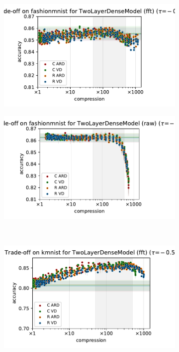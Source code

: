 \documentclass[a4paper,10pt,onecolumn]{article}
\begin{document}
\begin{figure}[b]
\begin{subfigure}[b]{0.5\columnwidth}
    \centering
    \includegraphics[width=\columnwidth]{figure__mnist-like__method_comparison/appendix__TwoLayerDenseModel__fashionmnist__fft__-0.5.pdf}
  \end{subfigure}%
  \begin{subfigure}[b]{0.5\columnwidth}
    \centering
    \includegraphics[width=\columnwidth]{figure__mnist-like__method_comparison/appendix__TwoLayerDenseModel__fashionmnist__raw__-0.5.pdf}
  \end{subfigure} \\ %
  \begin{subfigure}[b]{0.5\columnwidth}
    \centering
    \includegraphics[width=\columnwidth]{figure__mnist-like__method_comparison/appendix__TwoLayerDenseModel__kmnist__fft__-0.5.pdf}

\end{subfigure}
\end{figure}
\end{document}
